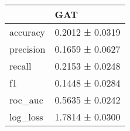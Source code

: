 \begin{tabular}{ll}
\toprule
 & GAT \\
\midrule
accuracy & 0.2012 ± 0.0319 \\
precision & 0.1659 ± 0.0627 \\
recall & 0.2153 ± 0.0248 \\
f1 & 0.1448 ± 0.0284 \\
roc_auc & 0.5635 ± 0.0242 \\
log_loss & 1.7814 ± 0.0300 \\
\bottomrule
\end{tabular}
